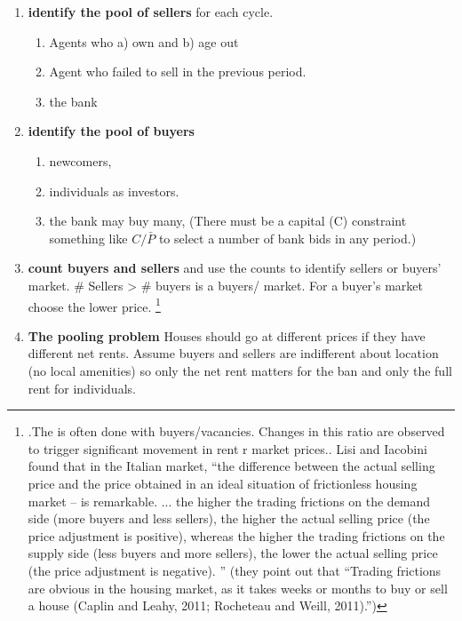 \begin{enumerate}
\item \textbf{identify the pool of sellers} for each cycle.
    \begin{enumerate}
        \item Agents who a) own and b) age out
        \item Agent  who failed to sell in the previous period.
        \item the bank
    \end{enumerate}
\item \textbf{identify the pool of buyers} 
    \begin{enumerate}
         \item newcomers, 
         \item individuals as investors.
         \item the bank may buy many, (There must be a capital (C) constraint something like $C/\bar P$ to select a number of bank bids in any period.)
    \end{enumerate}

\item \textbf{count buyers and sellers} and use the counts to identify sellers or buyers' market. \# Sellers > \# buyers is a buyers/ market. For a buyer's market  choose the lower price. \footnote{.The is often done with buyers/vacancies. Changes in this ratio are observed to trigger significant movement in rent r market prices.\cite{wheatonVacancySearchPrices1990}. Lisi and Iacobini \cite{lisiEstimatingHousingPrice2015} found  that in the Italian market, ``the difference between the actual selling price and the price obtained in an ideal situation of frictionless housing market – is remarkable. ... the higher the trading frictions on the demand side (more buyers and less sellers), the higher the actual selling price (the price adjustment is positive), whereas the higher the trading frictions on the supply side (less buyers and more sellers), the lower the actual selling price (the price adjustment is negative). '' (they point out that ``Trading frictions are obvious in the housing market, as it takes weeks or months to buy or sell a house (Caplin and Leahy, 2011; Rocheteau and Weill, 2011).'')}  

\item \textbf{The pooling problem}  Houses should go at different prices if they have different net rents.  Assume buyers and sellers are indifferent about location (no  local amenities) so only the net rent matters for the ban and only the full rent for individuals.


\end{enumerate}
